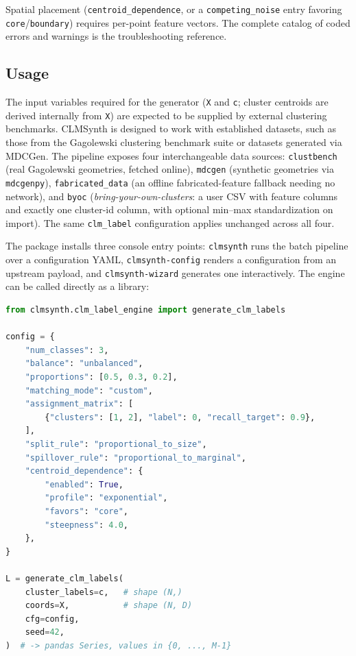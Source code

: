 \documentclass[a4paper,12pt]{article}
\begin{document}
\noindent Spatial placement (\texttt{centroid\_dependence}, or a
\texttt{competing\_noise} entry favoring \texttt{core}/\texttt{boundary}) requires per-point
feature vectors. The complete catalog of coded errors and warnings is the troubleshooting reference.

\newpage
\subsection*{Usage}
The input variables required for the generator (\texttt{X} and \texttt{c}; cluster centroids are derived internally from \texttt{X}) are expected to be supplied by external clustering benchmarks. CLMSynth is designed to work with established datasets, such as those from the Gagolewski clustering benchmark suite or datasets generated via MDCGen. The pipeline exposes four interchangeable data sources: \texttt{clustbench} (real Gagolewski geometries, fetched online), \texttt{mdcgen} (synthetic geometries via \texttt{mdcgenpy}), \texttt{fabricated\_data} (an offline fabricated-feature fallback needing no network), and \texttt{byoc} (\emph{bring-your-own-clusters}: a user CSV with feature columns and exactly one cluster-id column, with optional min--max standardization on import). The same \texttt{clm\_label} configuration applies unchanged across all four.

\noindent The package installs three console entry points: \texttt{clmsynth} runs the batch pipeline over a configuration YAML, \texttt{clmsynth-config} renders a configuration from an upstream payload, and \texttt{clmsynth-wizard} generates one interactively. The engine can be called directly as a library:
\begin{lstlisting}[language=Python]
from clmsynth.clm_label_engine import generate_clm_labels

config = {
    "num_classes": 3,
    "balance": "unbalanced",
    "proportions": [0.5, 0.3, 0.2],
    "matching_mode": "custom",
    "assignment_matrix": [
        {"clusters": [1, 2], "label": 0, "recall_target": 0.9},
    ],
    "split_rule": "proportional_to_size",
    "spillover_rule": "proportional_to_marginal",
    "centroid_dependence": {
        "enabled": True,
        "profile": "exponential",
        "favors": "core",
        "steepness": 4.0,
    },
}

L = generate_clm_labels(
    cluster_labels=c,   # shape (N,)
    coords=X,           # shape (N, D)
    cfg=config,
    seed=42,
)  # -> pandas Series, values in {0, ..., M-1}
\end{lstlisting}
\end{document}

